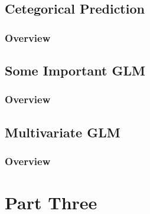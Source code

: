\documentclass[11pt,fleqn]{book} %
\begin{document}
\chapter{Cetegorical Prediction}

\section{Overview}



\chapter{Some Important GLM}

\section{Overview}



\chapter{Multivariate GLM}

\section{Overview}



 \part{Part Three}

\end{document}
